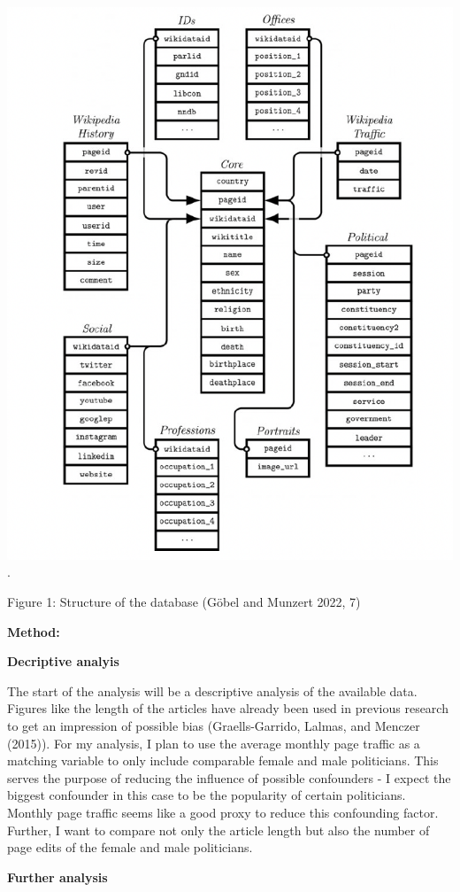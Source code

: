 \documentclass[
]{article}
\begin{document}
\includegraphics{Overview_cld.png}.

Figure 1: Structure of the database (Göbel and Munzert 2022, 7)

\textbf{Method:}

\textbf{Decriptive analyis}

The start of the analysis will be a descriptive analysis of the
available data. Figures like the length of the articles have already
been used in previous research to get an impression of possible bias
(Graells-Garrido, Lalmas, and Menczer (2015)). For my analysis, I plan
to use the average monthly page traffic as a matching variable to only
include comparable female and male politicians. This serves the purpose
of reducing the influence of possible confounders - I expect the biggest
confounder in this case to be the popularity of certain politicians.
Monthly page traffic seems like a good proxy to reduce this confounding
factor. Further, I want to compare not only the article length but also
the number of page edits of the female and male politicians.

\textbf{Further analysis}
\end{document}
